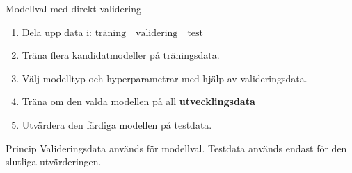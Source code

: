 \documentclass[10pt,english]{beamer}
\begin{document}
\begin{frame}{Modellval med direkt validering}

\begin{enumerate}
    \item Dela upp data i: $\text{träning} \quad \text{validering} \quad \text{test}$

    \item Träna flera kandidatmodeller på träningsdata.

    \item Välj modelltyp och hyperparametrar med hjälp av
    valideringsdata.

    \item Träna om den valda modellen på all \textbf{utvecklingsdata}
    \item Utvärdera den färdiga modellen på testdata.
\end{enumerate}

\vspace{0.2cm}

\begin{block}{Princip}
Valideringsdata används för modellval.
Testdata används endast för den slutliga utvärderingen.
\end{block}

\end{frame}

\end{document}
